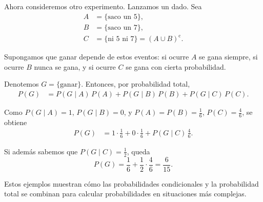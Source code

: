 \begin{example}
    Ahora consideremos otro experimento. Lanzamos un dado. Sea
    \begin{align*}
        A &= \{\text{saco un $5$}\}, \\
        B &= \{\text{saco un $7$}\}, \\
        C &= \{\text{ni $5$ ni $7$}\} = (A \cup B)^{\mathrm c}.
    \end{align*}

    Supongamos que ganar depende de estos eventos: 
    si ocurre $A$ se gana siempre, 
    si ocurre $B$ nunca se gana, 
    y si ocurre $C$ se gana con cierta probabilidad.

    Denotemos $G=\{\text{ganar}\}$. Entonces, por probabilidad total,
    \begin{align*}
        P(G) &= P(G \mid A)\,P(A) + P(G \mid B)\,P(B) + P(G \mid C)\,P(C).
    \end{align*}

    Como $P(G \mid A)=1$, $P(G \mid B)=0$, y $P(A)=P(B)=\frac{1}{6}$, $P(C)=\frac{4}{6}$, se obtiene
    \begin{align*}
        P(G) &= 1 \cdot \frac{1}{6} + 0 \cdot \frac{1}{6} + P(G \mid C)\,\frac{4}{6}.
    \end{align*}

    Si además sabemos que $P(G \mid C)=\frac{1}{2}$, queda
    \begin{equation*}
        P(G) = \frac{1}{6} + \frac{1}{2}\cdot\frac{4}{6} = \frac{6}{15}.
    \end{equation*}
\end{example}

Estos ejemplos muestran cómo las probabilidades condicionales y la probabilidad total se combinan para calcular probabilidades en situaciones más complejas.
